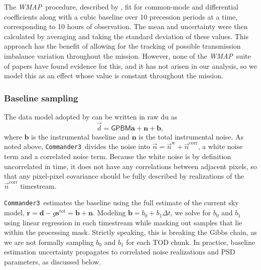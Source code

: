 \documentclass[twocolumn]{../../common/aa}
\def\WMAP{\emph{WMAP}}
\def\commanderthree{\texttt{Commander3}}
\newcommand{\n}[0]{\vec{n}}
\newcommand{\data}{\vec d}
\begin{document}
The \WMAP\ procedure, described by \citet{jarosik2003a}, fit for common-mode and differential coefficients along with a cubic baseline over 10 precession periods at a time, corresponding to 10 hours of observation. The mean and uncertainty were then calculated by averaging and taking the standard deviation of these values. This approach has the benefit of allowing for the tracking of possible transmission imbalance variation throughout the mission. However, none of the \WMAP\ suite of papers have found evidence for this, and it has not arisen in our analysis, so we model this as an effect whose value is constant throughout the mission.

\subsubsection{Baseline sampling}
\label{ssec:baseline}

The data model adopted by \citet{hinshaw2003a} can be written in raw du as
\begin{equation}
	\data = \mathsf{GPBM}\boldsymbol a+\boldsymbol n+\boldsymbol b,
\end{equation}
where $\boldsymbol b$ is the instrumental baseline and $\boldsymbol n$ is the
total instrumental noise. As noted above, \commanderthree\ divides
the noise into $\n=\n^\mathrm w+\n^\mathrm{corr}$, a white noise term and a
correlated noise term. Because the white noise is by definition uncorrelated in time, it does not have any
correlations between adjacent pixels, so that any pixel-pixel covariance should
be fully described by realizations of the $\n^\mathrm{corr}$ timestream.

\commanderthree\ estimates the baseline using the full estimate of the current sky
model, $\boldsymbol r=\boldsymbol d-g\boldsymbol s^\mathrm{tot}=\boldsymbol
b+\boldsymbol n$. Modeling $\boldsymbol b=b_0+b_1\Delta t$, we solve for $b_0$
and $b_1$ using linear regression in each timestream while masking out samples
that lie within the processing mask. Strictly speaking, this is breaking the
Gibbs chain, as we are not formally sampling $b_0$ and $b_1$ for each TOD
chunk. In practice, baseline estimation uncertainty propagates to correlated
noise realizations and PSD parameters, as discussed below.
\end{document}

